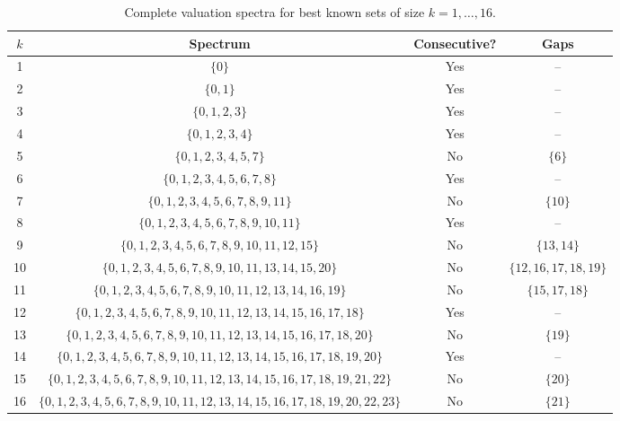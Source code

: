 \begin{table}[ht]
\centering
\begin{tabular}{c|c|c|c}
\toprule
$k$ & Spectrum & Consecutive? & Gaps \\
\midrule
1 & $\{0\}$ & Yes & -- \\
2 & $\{0,1\}$ & Yes & -- \\
3 & $\{0,1,2,3\}$ & Yes & -- \\
4 & $\{0,1,2,3,4\}$ & Yes & -- \\
5 & $\{0,1,2,3,4,5,7\}$ & No & $\{6\}$ \\
6 & $\{0,1,2,3,4,5,6,7,8\}$ & Yes & -- \\
7 & $\{0,1,2,3,4,5,6,7,8,9,11\}$ & No & $\{10\}$ \\
8 & $\{0,1,2,3,4,5,6,7,8,9,10,11\}$ & Yes & -- \\
9 & $\{0,1,2,3,4,5,6,7,8,9,10,11,12,15\}$ & No & $\{13,14\}$ \\
10 & $\{0,1,2,3,4,5,6,7,8,9,10,11,13,14,15,20\}$ & No & $\{12,16,17,18,19\}$ \\
11 & $\{0,1,2,3,4,5,6,7,8,9,10,11,12,13,14,16,19\}$ & No & $\{15,17,18\}$ \\
12 & $\{0,1,2,3,4,5,6,7,8,9,10,11,12,13,14,15,16,17,18\}$ & Yes & -- \\
13 & $\{0,1,2,3,4,5,6,7,8,9,10,11,12,13,14,15,16,17,18,20\}$ & No & $\{19\}$ \\
14 & $\{0,1,2,3,4,5,6,7,8,9,10,11,12,13,14,15,16,17,18,19,20\}$ & Yes & -- \\
15 & $\{0,1,2,3,4,5,6,7,8,9,10,11,12,13,14,15,16,17,18,19,21,22\}$ & No & $\{20\}$ \\
16 & $\{0,1,2,3,4,5,6,7,8,9,10,11,12,13,14,15,16,17,18,19,20,22,23\}$ & No & $\{21\}$ \\
\bottomrule
\end{tabular}
\caption{Complete valuation spectra for best known sets of size $k=1,\dots,16$.}
\label{tab:spectra}
\end{table}